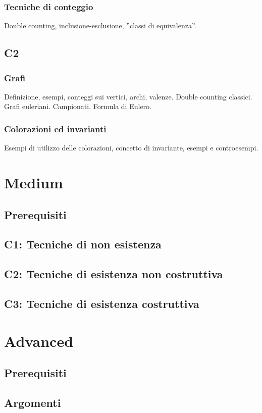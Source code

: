 \documentclass[a4paper,10pt]{article}
\begin{document}
\subsubsection{Tecniche di conteggio}
Double counting, inclusione-esclusione, ”classi di equivalenza”.


\subsection{C2}
\subsubsection{Grafi}
Definizione, esempi, conteggi sui vertici, archi, valenze. Double counting classici. Grafi euleriani. Campionati. Formula di Eulero.

\subsubsection{Colorazioni ed invarianti}
Esempi di utilizzo delle colorazioni, concetto di invariante, esempi e controesempi.


\section{Medium}
\subsection{Prerequisiti}
\subsection{C1: Tecniche di non esistenza}
\subsection{C2: Tecniche di esistenza non costruttiva}
\subsection{C3: Tecniche di esistenza costruttiva}


\section{Advanced}
\subsection{Prerequisiti}
\subsection{Argomenti}
\end{document}
